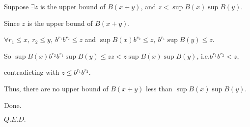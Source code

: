 \begin{Proof}
Suppose $\exists z$ is the upper bound of $B(x+y)$,
and $z<\sup B(x)\sup B(y)$.

Since $z$ is the upper bound of $B(x+y)$.

$\forall r_1\le x,\:r_2\le y,\:b^{r_1}b^{r_2}\le z$ and $\sup B(x)b^{r_2}\le z,\:b^{r_1}\sup B(y)\le z$.

So $\sup B(x)b^{r_2}b^{r_1}\sup B(y)\le zz<z\sup B(x)\sup B(y)$,
i.e.$b^{r_1}b^{r_2}<z$,

contradicting with $z\le b^{r_1}b^{r_2}$.

Thus, there are no upper bound of $B(x+y)$ less than $\sup B(x)\sup B(y)$.

Done.

\hfill$Q.E.D.$\qedhere\hspace{42pt}
\end{Proof}
\newpage